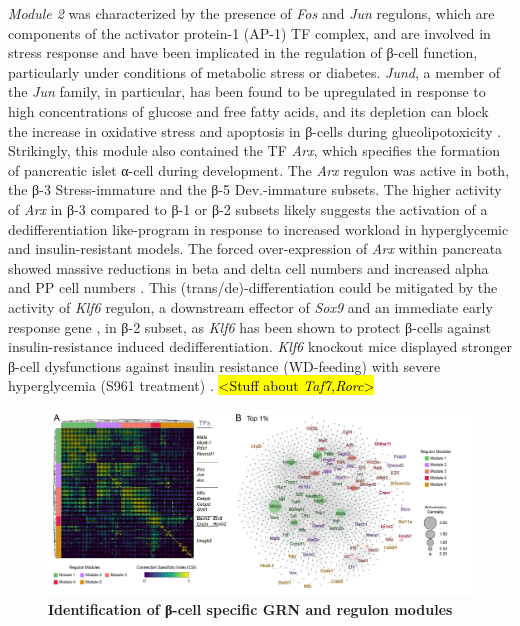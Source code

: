\textit{Module 2} was characterized by the presence of \textit{Fos} and \textit{Jun} regulons, which are components of the activator protein-1 (AP-1) TF complex, and are involved in stress response and have been implicated in the regulation of β-cell function, particularly under conditions of metabolic stress or diabetes. \textit{Jund}, a member of the \textit{Jun} family, in particular,  has been found to be upregulated  in response to high concentrations of glucose and free fatty acids, and its depletion can block the increase in oxidative stress and apoptosis in β-cells during glucolipotoxicity \textbf{\cite{good_jund_2019}}. Strikingly, this module also contained the TF \textit{Arx}, which specifies the formation of pancreatic islet α-cell during development. The \textit{Arx} regulon was active in both, the β-3 Stress-immature and the β-5 Dev.-immature subsets. The higher activity of \textit{Arx} in β-3 compared to β-1 or β-2 subsets likely suggests the activation of a dedifferentiation like-program in response to increased workload in hyperglycemic and insulin-resistant models. The forced over-expression of \textit{Arx} within pancreata showed massive reductions in beta and delta cell numbers and increased alpha and PP cell numbers \textbf{\cite{van_der_meulen_role_2015}}. This (trans/de)-differentiation could be mitigated by the activity of \textit{Klf6} regulon, a downstream effector of \textit{Sox9} \textbf{\cite{puri_sox9_2024}} and an immediate early response gene \textbf{\cite{xin_single-cell_2016}}, in β-2 subset, as \textit{Klf6} has been shown to protect β-cells against insulin-resistance induced dedifferentiation. \textit{Klf6} knockout mice displayed stronger β-cell dysfunctions against insulin resistance (WD-feeding) with severe hyperglycemia (S961 treatment) \textbf{\cite{dumayne_klf6_2020}}. \hl{<Stuff about \textit{Taf7,Rorc}>}\\

\begin{figure}[t]
\centering
\includegraphics[width=\linewidth]{Chapter5/Fig/F3-10-02.png}
\caption[Identification of β-cell specific GRN and regulon modules]{\textbf{Identification of β-cell specific GRN and regulon modules}\\}
\label{fig:3-10}
\end{figure}

